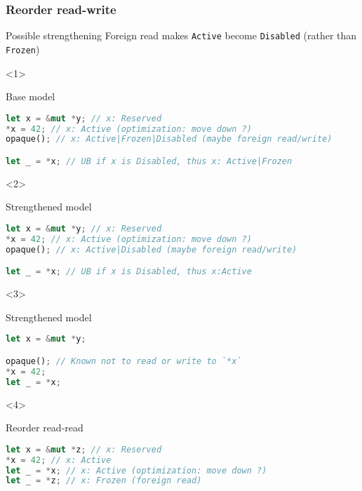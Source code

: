 \begin{frame}[fragile, t]
    \frametitle{Reorder read-write}
    \begin{exampleblock}{Possible strengthening}
        Foreign read makes \texttt{Active} become \texttt{Disabled}
        (rather than \texttt{Frozen})
    \end{exampleblock}


    \begin{onlyenv}<1>
        \begin{block}{{\xmark} Base model}
            \begin{lstlisting}[language=rust, basicstyle=\ttfamily\scriptsize]
let x = &mut *y; // x: Reserved
*x = 42; // x: Active (optimization: move down ?)
opaque(); // x: Active|Frozen|Disabled (maybe foreign read/write)

let _ = *x; // UB if x is Disabled, thus x: Active|Frozen
            \end{lstlisting}
        \end{block}
    \end{onlyenv}

    \begin{onlyenv}<2>
        \begin{block}{{\cmark} Strengthened model}
            \begin{lstlisting}[language=rust, basicstyle=\ttfamily\scriptsize]
let x = &mut *y; // x: Reserved
*x = 42; // x: Active (optimization: move down ?)
opaque(); // x: Active|Disabled (maybe foreign read/write)

let _ = *x; // UB if x is Disabled, thus x:Active
            \end{lstlisting}
        \end{block}
    \end{onlyenv}

    \begin{onlyenv}<3>
        \begin{block}{{\cmark} Strengthened model}
            \begin{lstlisting}[language=rust, basicstyle=\ttfamily\scriptsize]
let x = &mut *y;

opaque(); // Known not to read or write to `*x`
*x = 42;
let _ = *x;
            \end{lstlisting}
        \end{block}
    \end{onlyenv}


    \begin{onlyenv}<4>
        \begin{block}{{\cmark} Reorder read-read}
            \begin{lstlisting}[language=rust]
let x = &mut *z; // x: Reserved
*x = 42; // x: Active
let _ = *x; // x: Active (optimization: move down ?)
let _ = *z; // x: Frozen (foreign read)


\end{lstlisting}
\end{block}
\end{onlyenv}
\end{frame}
